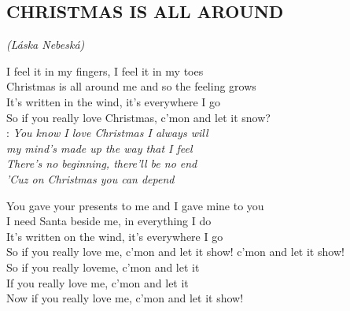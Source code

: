 \begin{flushleft}
	\section*{\Huge CHRISTMAS IS ALL AROUND}
	\emph{(Láska Nebeská)}
\end{flushleft}

I feel it in my fingers, I feel it in my toes\\
Christmas is all around me and so the feeling grows\\

It's written in the wind, it's everywhere I go\\
So if you really love Christmas, c'mon and let it snow?\\

\textregistered:
\emph{
You know I love Christmas I always will\\
my mind's made up the way that I feel\\
There's no beginning, there'll be no end\\
'Cuz on Christmas you can depend\\
}

You gave your presents to me and I gave mine to you\\
I need Santa beside me, in everything I do \hspace{1cm} \textregistered\\

It's written on the wind, it's everywhere I go\\
So if you really love me, c'mon and let it show! c'mon and let it show!\\

So if you really loveme, c'mon and let it\\
If you really love me,\hspace{0,5cm} c'mon and let it\\
Now if you really love me,\hspace{0,5cm} c'mon and let it show!\\

\newpage
